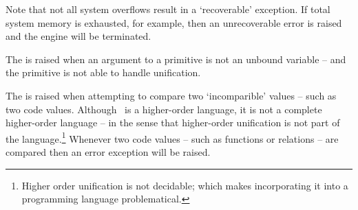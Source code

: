 \begin{description}
Note that not all system overflows result in a `recoverable' exception. If total system memory is exhausted, for example, then an unrecoverable error is raised and the \go engine will be terminated.
    
\item[\constant{'eVARNEEDD'}]
\label{eVARNEEDD}
  
The  is raised when an argument to a primitive is not an unbound variable -- and the primitive is not able to handle unification.
  
\item[\constant{'eUNIFY'}]
\label{eUNIFY}
  
The  is raised when attempting to compare two `incomparible' values -- such as two code values. Although \go\ is a higher-order language, it is not a complete higher-order language -- in the sense that higher-order unification is not part of the language.\footnote{Higher order unification is not decidable; which makes incorporating it into a programming language problematical.} Whenever two code values -- such as functions or relations -- are compared then an  error exception will be raised.

\end{description}
